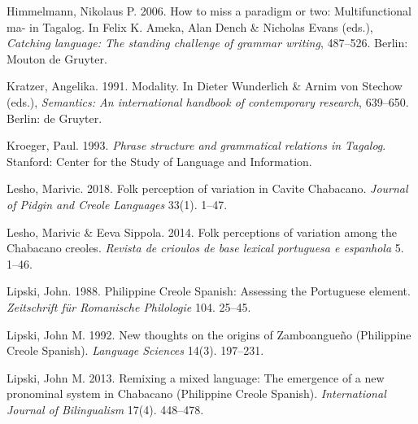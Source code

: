 \begin{styleBibliography}
Himmelmann, Nikolaus P. 2006. How to miss a paradigm or two: Multifunctional ma- in Tagalog. In Felix K. Ameka, Alan Dench \& Nicholas Evans (eds.), \textit{Catching language: The standing challenge of grammar writing}, 487–526. Berlin: Mouton de Gruyter.
\end{styleBibliography}

\begin{styleBibliography}
Kratzer, Angelika. 1991. Modality. In Dieter Wunderlich \& Arnim von Stechow (eds.), \textit{Semantics: An international handbook of contemporary research}, 639–650. Berlin: de Gruyter.
\end{styleBibliography}

\begin{styleBibliography}
Kroeger, Paul. 1993. \textit{Phrase structure and grammatical relations in Tagalog}. Stanford: Center for the Study of Language and Information.
\end{styleBibliography}

\begin{styleBibliography}
Lesho, Marivic. 2018. Folk perception of variation in Cavite Chabacano. \textit{Journal of Pidgin and Creole Languages} 33(1). 1–47.
\end{styleBibliography}

\begin{styleBibliography}
Lesho, Marivic \& Eeva Sippola. 2014. Folk perceptions of variation among the Chabacano creoles. \textit{Revista de crioulos de base lexical portuguesa e espanhola} 5. 1–46.
\end{styleBibliography}

\begin{styleBibliography}
Lipski, John. 1988. Philippine Creole Spanish: Assessing the Portuguese element. \textit{Zeitschrift für Romanische Philologie} 104. 25–45.
\end{styleBibliography}

\begin{styleBibliography}
Lipski, John M. 1992. New thoughts on the origins of Zamboangueño (Philippine Creole Spanish). \textit{Language Sciences} 14(3). 197–231.
\end{styleBibliography}

\begin{styleBibliography}
Lipski, John M. 2013. Remixing a mixed language: The emergence of a new pronominal system in Chabacano (Philippine Creole Spanish). \textit{International Journal of Bilingualism} 17(4). 448–478.
\end{styleBibliography}

